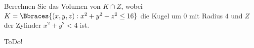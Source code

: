 
\begin{exercise}

Berechnen Sie das Volumen von $K \cap Z$, wobei $K = \Bbraces{(x, y, z): x^2 + y^2 + z^2 \leq 16}$ die Kugel um $0$ mit Radius $4$ und $Z$ der Zylinder $x^2 + y^2 < 4$ ist.

\end{exercise}


\begin{solution}

ToDo!

\end{solution}

